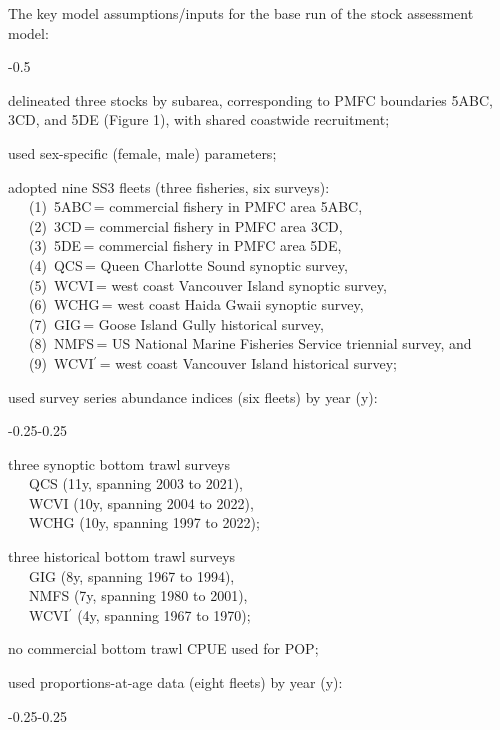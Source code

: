 \documentclass[11pt]{book}
\begin{document}
The key model assumptions/inputs for the base run of the stock assessment model:
\begin{itemize_csas}{-0.5}{}
	\item delineated three stocks by subarea, corresponding to PMFC boundaries  5ABC, 3CD, and 5DE (Figure 1), with shared coastwide recruitment;
	\item used sex-specific (female, male) parameters;
	\item adopted nine SS3 fleets (three fisheries, six surveys):\\
	~~~(1)~5ABC\,= commercial fishery in PMFC area 5ABC,\\
	~~~(2)~3CD\,= commercial fishery in PMFC area 3CD,\\
	~~~(3)~5DE\,= commercial fishery in PMFC area 5DE,\\
	~~~(4)~QCS\,= Queen Charlotte Sound synoptic survey,\\
	~~~(5)~WCVI\,= west coast Vancouver Island synoptic survey,\\
	~~~(6)~WCHG\,= west coast Haida Gwaii synoptic survey,\\
	~~~(7)~GIG\,= Goose Island Gully historical survey,\\
	~~~(8)~NMFS\,= US National Marine Fisheries Service triennial survey, and\\
	~~~(9)~WCVI$^\prime$\,= west coast Vancouver Island historical survey;
	\item used survey series abundance indices (six fleets) by year (y):
	\begin{itemize_csas}{-0.25}{-0.25}
		\item three synoptic bottom trawl surveys\\
			~~~QCS (11y, spanning 2003 to 2021),\\
			~~~WCVI (10y, spanning 2004 to 2022),\\
			~~~WCHG (10y, spanning 1997 to 2022);
		\item three historical bottom trawl surveys\\
			~~~GIG (8y, spanning 1967 to 1994),\\
			~~~NMFS (7y, spanning 1980 to 2001),\\
			~~~WCVI$^\prime$ (4y, spanning 1967 to 1970);\\
		\item no commercial bottom trawl CPUE used for POP;
	\end{itemize_csas}
	\item used proportions-at-age data (eight fleets) by year (y):
	\begin{itemize_csas}{-0.25}{-0.25}

\end{itemize_csas}
\end{itemize_csas}
\end{document}
